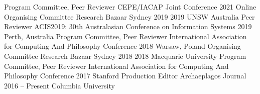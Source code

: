 
\begin{cventries}
\cventry
    {Program Committee, Peer Reviewer}
    {CEPE/IACAP Joint Conference}
    {2021}
    {Online}
    {}    
\cventry
    {Organising Committee}
    {Research Bazaar Sydney 2019}
    {2019}
    {UNSW Australia}
    {}
\cventry
    {Peer Reviewer}
    {ACIS2019: 30th Australasian Conference on Information Systems}
    {2019}
    {Perth, Australia}
    {}
\cventry
    {Program Committee, Peer Reviewer}
    {International Association for Computing And Philosophy Conference}
    {2018}
    {Warsaw, Poland}
    {}    
\cventry
    {Organising Committee}
    {Research Bazaar Sydney 2018}
    {2018}
    {Macquarie University}
    {}    
\cventry
    {Program Committee, Peer Reviewer}
    {International Association for Computing And Philosophy Conference}
    {2017}
    {Stanford}
    {}
\cventry
    {Production Editor}
    {Archaeplagos Journal}
    {2016 -- Present}
    {Columbia University}
    {}    
\end{cventries}


